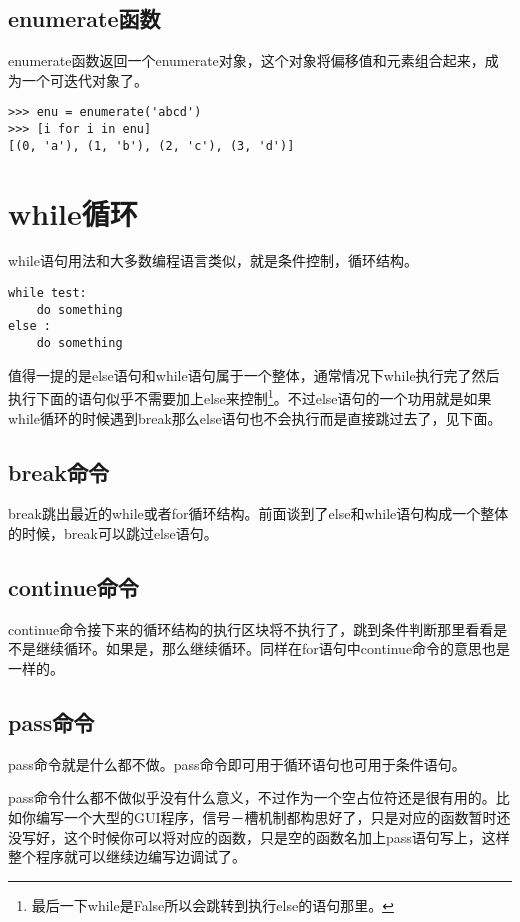 \documentclass[12pt,oneside]{book}
\begin{document}
\begin{common-format}
\subsection{enumerate函数}
enumerate函数返回一个enumerate对象，这个对象将偏移值和元素组合起来，成为一个可迭代对象了。

\begin{Verbatim}
>>> enu = enumerate('abcd')
>>> [i for i in enu]
[(0, 'a'), (1, 'b'), (2, 'c'), (3, 'd')]
\end{Verbatim}


\section{while循环}
while语句用法和大多数编程语言类似，就是条件控制，循环结构。
\begin{Verbatim}
while test:
    do something
else :
    do something
\end{Verbatim}

值得一提的是else语句和while语句属于一个整体，通常情况下while执行完了然后执行下面的语句似乎不需要加上else来控制\footnote{最后一下while是False所以会跳转到执行else的语句那里。}。不过else语句的一个功用就是如果while循环的时候遇到break那么else语句也不会执行而是直接跳过去了，见下面。

\subsection{break命令}
break跳出最近的while或者for循环结构。前面谈到了else和while语句构成一个整体的时候，break可以跳过else语句。

\subsection{continue命令}
continue命令接下来的循环结构的执行区块将不执行了，跳到条件判断那里看看是不是继续循环。如果是，那么继续循环。同样在for语句中continue命令的意思也是一样的。


\subsection{pass命令}
pass命令就是什么都不做。pass命令即可用于循环语句也可用于条件语句。

pass命令什么都不做似乎没有什么意义，不过作为一个空占位符还是很有用的。比如你编写一个大型的GUI程序，信号－槽机制都构思好了，只是对应的函数暂时还没写好，这个时候你可以将对应的函数，只是空的函数名加上pass语句写上，这样整个程序就可以继续边编写边调试了。








\end{common-format}
\end{document}
